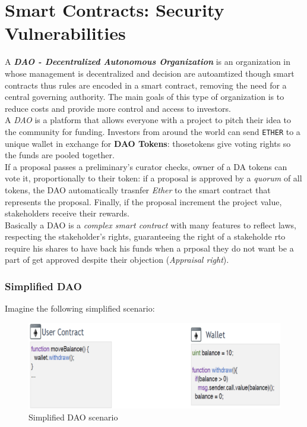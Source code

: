 \documentclass[10pt,a4paper]{report}
\begin{document}
\section{Smart Contracts: Security Vulnerabilities}\label{sec:smart-contracts-security-vulnerabilities}
A \textit{\textbf{DAO - Decentralized Autonomous Organization}} is an organization in whose management is decentralized and decision are autoamtized though smart contracts thus rules are encoded in a smart contract, removing the need for a central governing authority. The main goals of this type of organization is to reduce costs and provide more control and access to investors.\\
A \textit{DAO} is a platform that allows everyone with a project to pitch their idea to the community for funding. Investors from around the world can send \texttt{ETHER} to a unique wallet in exchange for \textbf{DAO Tokens}: thosetokens give voting rights so the funds are pooled together.\\
If a proposal passes a preliminary's curator checks, owner of a DA tokens can vote it, proportionally to their token: if a proposal is approved by a \textit{quorum} of all tokens, the DAO automatically trasnfer \textit{Ether} to the smart contract that represents the proposal. Finally, if the proposal increment the project value, stakeholders receive their rewards.\\
Basically a DAO is a \textit{complex smart contract} with many features to reflect laws, respecting the stakeholder's rights, guaranteeing the right of a stakeholde rto require his shares to have back his funds when a prposal they do not want be a part of get approved despite their objection (\textit{Appraisal right}).
\subsubsection{Simplified DAO}\label{sec:simplified-dao}
Imagine the following simplified scenario:
\begin{figure}[h]
	\centering
	\includegraphics[scale=0.30]{images/Pasted image 20230427075120.png}
	\caption{Simplified DAO scenario}
\end{figure}
\end{document}
